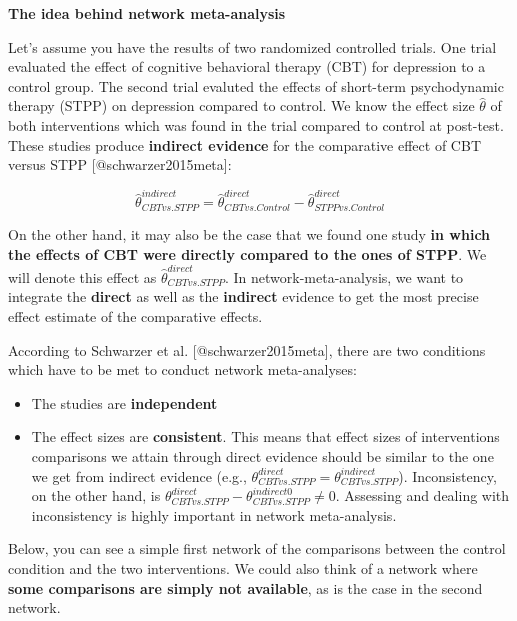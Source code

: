 \documentclass[]{book}
\providecommand{\tightlist}{%
  \setlength{\itemsep}{0pt}\setlength{\parskip}{0pt}}
\theoremstyle{definition}
\theoremstyle{definition}
\theoremstyle{definition}
\theoremstyle{remark}
\begin{document}
\begin{rmdinfo}
\textbf{The idea behind network meta-analysis}

Let's assume you have the results of two randomized controlled trials.
One trial evaluated the effect of cognitive behavioral therapy (CBT) for
depression to a control group. The second trial evaluted the effects of
short-term psychodynamic therapy (STPP) on depression compared to
control. We know the effect size \(\hat\theta\) of both interventions
which was found in the trial compared to control at post-test. These
studies produce \textbf{indirect evidence} for the comparative effect of
CBT versus STPP {[}@schwarzer2015meta{]}:

\[\hat\theta_{CBT vs. STPP}^{indirect}=\hat\theta_{CBT vs. Control}^{direct} -\hat\theta_{STPP vs.Control}^{direct} \]

On the other hand, it may also be the case that we found one study
\textbf{in which the effects of CBT were directly compared to the ones
of STPP}. We will denote this effect as
\(\hat\theta_{CBT vs. STPP}^{direct}\). In network-meta-analysis, we
want to integrate the \textbf{direct} as well as the \textbf{indirect}
evidence to get the most precise effect estimate of the comparative
effects.

According to Schwarzer et al. {[}@schwarzer2015meta{]}, there are two
conditions which have to be met to conduct network meta-analyses:

\begin{itemize}
\tightlist
\item
  The studies are \textbf{independent}
\item
  The effect sizes are \textbf{consistent}. This means that effect sizes
  of interventions comparisons we attain through direct evidence should
  be similar to the one we get from indirect evidence (e.g.,
  \(\theta_{CBT vs. STPP}^{direct}=\theta_{CBT vs. STPP}^{indirect}\)).
  Inconsistency, on the other hand, is
  \(\theta_{CBT vs. STPP}^{direct}-\theta_{CBT vs. STPP}^{indirect0} \not= 0\).
  Assessing and dealing with inconsistency is highly important in
  network meta-analysis.
\end{itemize}

Below, you can see a simple first network of the comparisons between the
control condition and the two interventions. We could also think of a
network where \textbf{some comparisons are simply not available}, as is
the case in the second network.
\end{rmdinfo}
\end{document}
